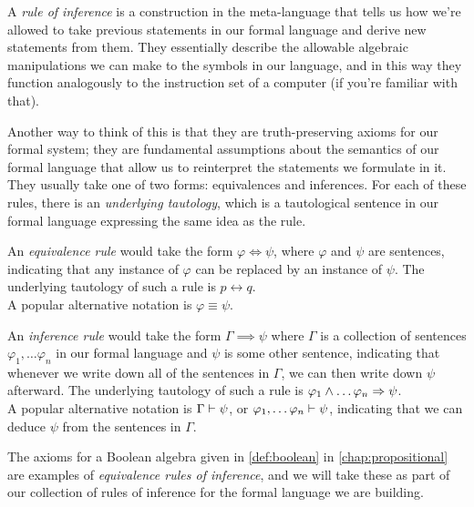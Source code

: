 \begin{definition}
    A \emph{rule of inference} is a construction in the meta-language that tells us
    how we're allowed to take previous statements in our formal language and derive new statements from them.
    They essentially describe the allowable algebraic manipulations we can make to the symbols in our language,
    and in this way they function analogously to the instruction set of a computer
    (if you're familiar with that).

    Another way to think of this is that they are truth-preserving axioms for our formal system;
    they are fundamental assumptions about the semantics of our formal language
    that allow us to reinterpret the statements we formulate in it.
    They usually take one of two forms: equivalences and inferences.
    For each of these rules, there is an \emph{underlying tautology},
    which is a tautological sentence in our formal language expressing the same idea as the rule.

    An \emph{equivalence rule} would take the form \(\varphi \iff \psi\),
    where \(\varphi\) and \(\psi\) are sentences,
    indicating that any instance of \(\varphi\) can be replaced by an instance of \(\psi\).
    The underlying tautology of such a rule is \(p \leftrightarrow q\).
    \\
    A popular alternative notation is \(\varphi \equiv \psi\).

    An \emph{inference rule} would take the form \(\Gamma \implies \psi\)
    where \(\Gamma\) is a collection of sentences
    \(\varphi_1, \dots \varphi_n\) in our formal language
    and \(\psi\) is some other sentence,
    indicating that whenever we write down all of the sentences in \(\Gamma\),
    we can then write down \(\psi\) afterward.
    The underlying tautology of such a rule is
    \(\varphi_1 \wedge \dots \varphi_n \Rightarrow \psi\).
    \\
    A popular alternative notation is \(\Gamma \vdash \psi\), or \(\varphi_1, \dots \varphi_n \vdash \psi\),
    indicating that we can deduce \(\psi\) from the sentences in \(\Gamma\).
\end{definition}

The axioms for a Boolean algebra given in
\autoref{def:boolean} in \autoref{chap:propositional}
are examples of \emph{equivalence rules of inference},
and we will take these as part of our collection of rules of inference for the formal language we are building.

